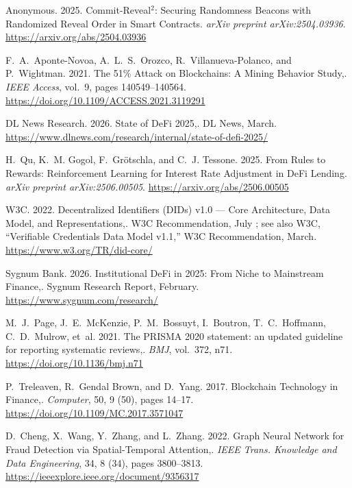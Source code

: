 {\begin{enumerate}[label={[\arabic*]}]
\item Anonymous. 2025. Commit-Reveal$^2$: Securing Randomness Beacons with Randomized Reveal Order in Smart Contracts. \emph{arXiv preprint arXiv:2504.03936}. \url{https://arxiv.org/abs/2504.03936}

\item F.~A.~Aponte-Novoa, A.~L.~S.~Orozco, R.~Villanueva-Polanco, and P.~Wightman. 2021. The 51\% Attack on Blockchains: A Mining Behavior Study,. \emph{IEEE Access}, vol.~9, pages 140549--140564. \url{https://doi.org/10.1109/ACCESS.2021.3119291}

\item DL News Research. 2026. State of DeFi 2025,. DL News, March. \url{https://www.dlnews.com/research/internal/state-of-defi-2025/}

\item H.~Qu, K.~M. Gogol, F.~Gr\"{o}tschla, and C.~J. Tessone. 2025. From Rules to Rewards: Reinforcement Learning for Interest Rate Adjustment in DeFi Lending. \emph{arXiv preprint arXiv:2506.00505}. \url{https://arxiv.org/abs/2506.00505}

\item W3C. 2022. Decentralized Identifiers (DIDs) v1.0 --- Core Architecture, Data Model, and Representations,. W3C Recommendation, July ; see also W3C, ``Verifiable Credentials Data Model v1.1,'' W3C Recommendation, March. \url{https://www.w3.org/TR/did-core/}

\item Sygnum Bank. 2026. Institutional DeFi in 2025: From Niche to Mainstream Finance,. Sygnum Research Report, February. \url{https://www.sygnum.com/research/}

\item M.~J.~Page, J.~E.~McKenzie, P.~M.~Bossuyt, I.~Boutron, T.~C.~Hoffmann, C.~D.~Mulrow, et~al. 2021. The PRISMA 2020 statement: an updated guideline for reporting systematic reviews,. \emph{BMJ}, vol.~372, n71. \url{https://doi.org/10.1136/bmj.n71}

\item P.~Treleaven, R.~Gendal Brown, and D.~Yang. 2017. Blockchain Technology in Finance,. \emph{Computer}, 50, 9 (50), pages 14--17. \url{https://doi.org/10.1109/MC.2017.3571047}

\item D.~Cheng, X.~Wang, Y.~Zhang, and L.~Zhang. 2022. Graph Neural Network for Fraud Detection via Spatial-Temporal Attention,. \emph{IEEE Trans. Knowledge and Data Engineering}, 34, 8 (34), pages 3800--3813. \url{https://ieeexplore.ieee.org/document/9356317}


\end{enumerate}}
